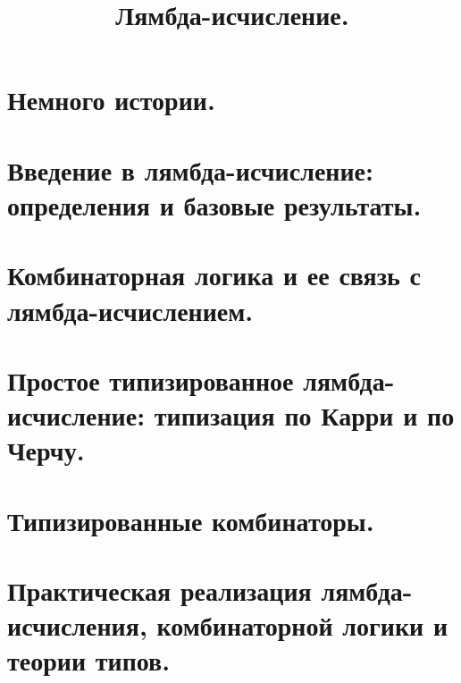 \documentclass[a4paper]{article}
\begin{document}
\title{Лямбда-исчисление.}
\section{Немного истории.}
\section{Введение в лямбда-исчисление: определения и базовые результаты.}
\section{Комбинаторная логика и ее связь с лямбда-исчислением.}
\section{Простое типизированное лямбда-исчисление: типизация по Карри и по Черчу.}
\section{Типизированные комбинаторы.}
\section{Практическая реализация лямбда-исчисления, комбинаторной логики и теории типов.}
\end{document}
